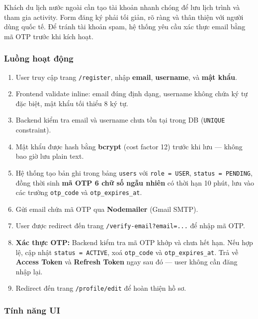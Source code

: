 \documentclass[12pt,a4paper]{article}
\begin{document}
Khách du lịch nước ngoài cần tạo tài khoản nhanh chóng để lưu lịch trình và
tham gia activity. Form đăng ký phải tối giản, rõ ràng và thân thiện với người
dùng quốc tế. Để tránh tài khoản spam, hệ thống yêu cầu xác thực email bằng
mã OTP trước khi kích hoạt.

\subsubsection{Luồng hoạt động}

\begin{enumerate}
  \item User truy cập trang \texttt{/register}, nhập \textbf{email},
        \textbf{username}, và \textbf{mật khẩu}.
  \item Frontend validate inline: email đúng định dạng, username không chứa
        ký tự đặc biệt, mật khẩu tối thiểu 8 ký tự.
  \item Backend kiểm tra email và username chưa tồn tại trong DB
        (\texttt{UNIQUE} constraint).
  \item Mật khẩu được hash bằng \textbf{bcrypt} (cost factor 12) trước khi
        lưu --- không bao giờ lưu plain text.
  \item Hệ thống tạo bản ghi trong bảng \texttt{users} với
        \texttt{role = USER}, \texttt{status = PENDING}, đồng thời sinh
        \textbf{mã OTP 6 chữ số ngẫu nhiên} có thời hạn 10 phút, lưu vào
        các trường \texttt{otp\_code} và \texttt{otp\_expires\_at}.
  \item Gửi email chứa mã OTP qua \textbf{Nodemailer} (Gmail SMTP).
  \item User được redirect đến trang \texttt{/verify-email?email=...} để
        nhập mã OTP.
  \item \textbf{Xác thực OTP:} Backend kiểm tra mã OTP khớp và chưa hết hạn.
        Nếu hợp lệ, cập nhật \texttt{status = ACTIVE}, xoá \texttt{otp\_code}
        và \texttt{otp\_expires\_at}. Trả về \textbf{Access Token} và
        \textbf{Refresh Token} ngay sau đó --- user không cần đăng nhập lại.
  \item Redirect đến trang \texttt{/profile/edit} để hoàn thiện hồ sơ.
\end{enumerate}

\subsubsection{Tính năng UI}
\end{document}
